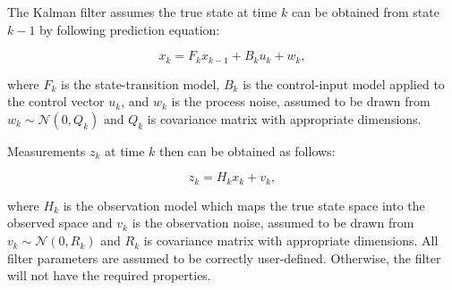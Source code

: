         The Kalman filter assumes the true state at time $k$ can be obtained from state $k - 1$ by following prediction equation: 
        
        \begin{equation}
            x_k = F_k x_{k-1} + B_k u_k + w_k,
        \end{equation}
        
        where $F_k$ is the  state-transition model, $B_k$ is the control-input model applied to the control vector $u_k$, and $w_k$ is the process noise, assumed to be drawn from 
        $w_k \sim {\mathcal {N}} (0,Q_k)$ and $Q_k$ is covariance matrix with appropriate dimensions.
        
        Measurements $z_k$ at time $k$ then can be obtained as follows:
        
        \begin{equation}
           z_{k} = H_{k} x_{k} + v_{k},
        \end{equation}
        
        where $H_k$ is the observation model which maps the true state space into the observed space and $v_k$ is the observation noise, assumed to be drawn from 
        $v_k \sim {\mathcal {N}} (0,R_k)$ and $R_k$ is covariance matrix with appropriate dimensions. All filter parameters are assumed to be correctly user-defined. Otherwise, the filter will not have the required properties.


